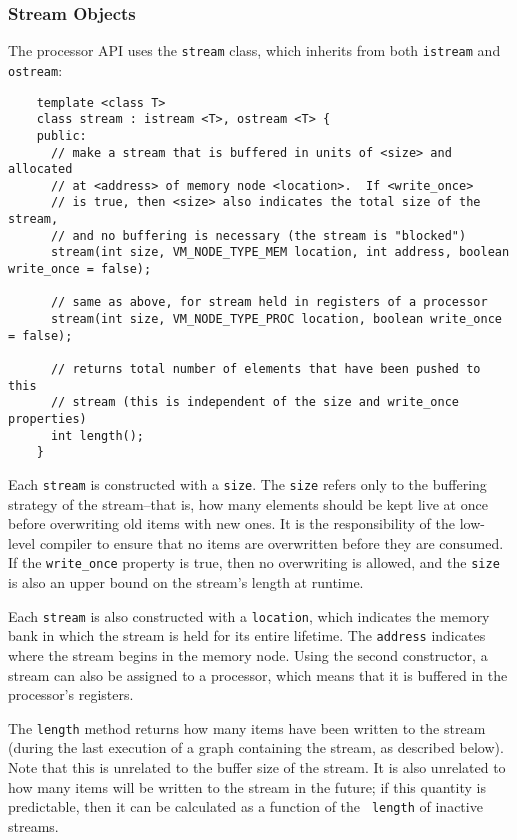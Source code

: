 \subsubsection{Stream Objects}
\label{sec:procstreams}

The processor API uses the {\tt stream} class, which inherits from
both {\tt istream} and {\tt ostream}:
{\small
\begin{verbatim}
    template <class T> 
    class stream : istream <T>, ostream <T> {
    public:
      // make a stream that is buffered in units of <size> and allocated
      // at <address> of memory node <location>.  If <write_once>
      // is true, then <size> also indicates the total size of the stream,
      // and no buffering is necessary (the stream is "blocked")
      stream(int size, VM_NODE_TYPE_MEM location, int address, boolean write_once = false);

      // same as above, for stream held in registers of a processor
      stream(int size, VM_NODE_TYPE_PROC location, boolean write_once = false);

      // returns total number of elements that have been pushed to this
      // stream (this is independent of the size and write_once properties)
      int length();
    }  
\end{verbatim}}

Each {\tt stream} is constructed with a {\tt size}.  The {\tt size}
refers only to the buffering strategy of the stream--that is, how many
elements should be kept live at once before overwriting old items with
new ones.  It is the responsibility of the low-level compiler to
ensure that no items are overwritten before they are consumed.  If the
{\tt write\_once} property is true, then no overwriting is allowed,
and the {\tt size} is also an upper bound on the stream's length at
runtime.

Each {\tt stream} is also constructed with a {\tt location}, which
indicates the memory bank in which the stream is held for its entire
lifetime.  The {\tt address} indicates where the stream begins in the
memory node.  Using the second constructor, a stream can also be
assigned to a processor, which means that it is buffered in the
processor's registers.

The {\tt length} method returns how many items have been written to
the stream (during the last execution of a graph containing the
stream, as described below).  Note that this is unrelated to the
buffer size of the stream.  It is also unrelated to how many items
will be written to the stream in the future; if this quantity is
predictable, then it can be calculated as a function of the {\tt
length} of inactive streams.

